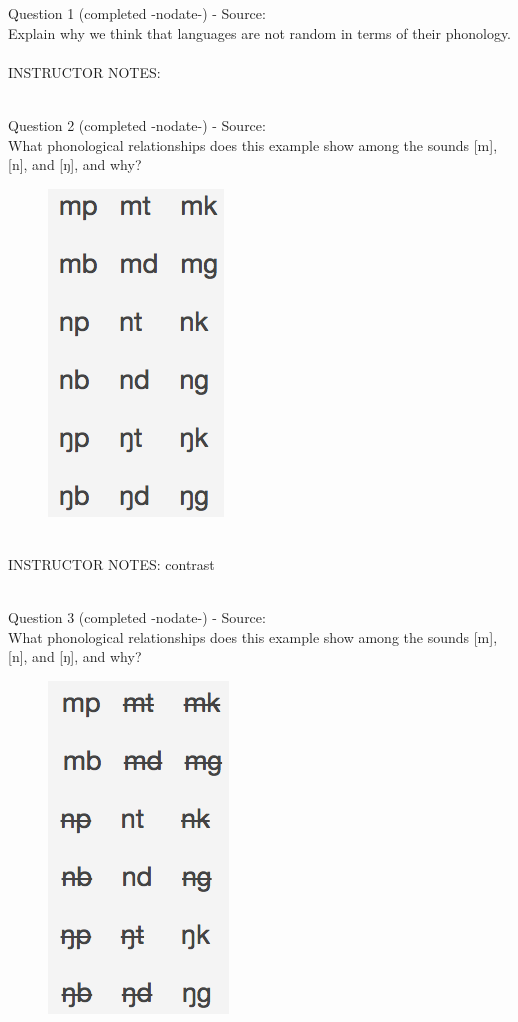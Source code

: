 \documentclass[12pt]{article}
\begin{document}
{\large Question 1} (completed -nodate-) - Source: \\

Explain why we think that languages are not random in terms of their phonology.\\


~\\
INSTRUCTOR NOTES: 


~\\

{\large Question 2} (completed -nodate-) - Source: \\

What phonological relationships does this example show among the sounds [m], [n], and [ŋ], and why?\\

\begin{figure}[H]
\includegraphics{../images/quiz4question5_a.png}
\end{figure}

~\\
INSTRUCTOR NOTES: contrast


~\\

{\large Question 3} (completed -nodate-) - Source: \\

What phonological relationships does this example show among the sounds [m], [n], and [ŋ], and why?\\

\begin{figure}[H]
\includegraphics{../images/quiz4question5_b.png}
\end{figure}
\end{document}
